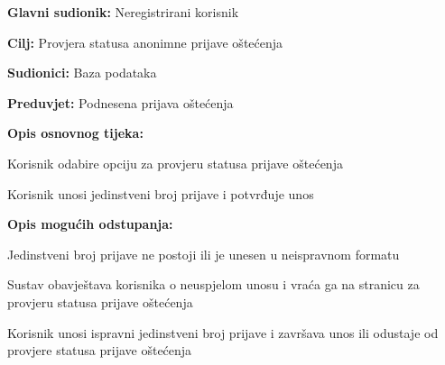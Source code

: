 \noindent {}
\begin{packed_item}

	\item \textbf{Glavni sudionik: } Neregistrirani korisnik
	\item  \textbf{Cilj:} Provjera statusa anonimne prijave oštećenja
	\item  \textbf{Sudionici:} Baza podataka
	\item  \textbf{Preduvjet:} Podnesena prijava oštećenja
	\item  \textbf{Opis osnovnog tijeka:}

	\item[] \begin{packed_enum}

		\item Korisnik odabire opciju za provjeru statusa prijave oštećenja
		\item Korisnik unosi jedinstveni broj prijave i potvrđuje unos
	\end{packed_enum}

	\item  \textbf{Opis mogućih odstupanja:}

	\item[] \begin{packed_item}

		\item[2.a] Jedinstveni broj prijave ne postoji ili je unesen u neispravnom formatu
		\item[] \begin{packed_enum}

			\item Sustav obavještava korisnika o neuspjelom unosu i vraća ga na stranicu za provjeru statusa prijave oštećenja
			\item Korisnik unosi ispravni jedinstveni broj prijave i završava unos ili odustaje od provjere statusa prijave oštećenja

		\end{packed_enum}

	\end{packed_item}
\end{packed_item}


